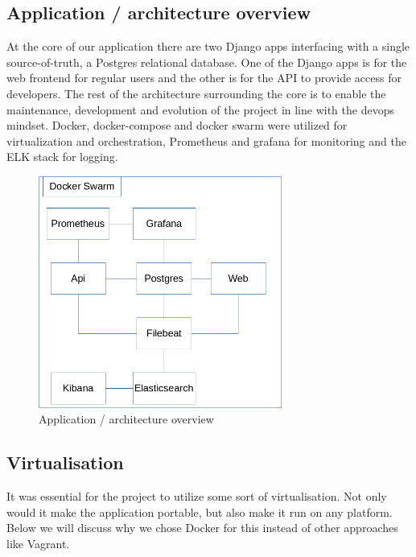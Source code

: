 \documentclass[12pt]{article}
\begin{document}
\subsection{Application / architecture overview}

At the core of our application there are two Django apps interfacing with a single source-of-truth, a Postgres relational database. One of the Django apps is for the web frontend for regular users and the other is for the API to provide access for developers. The rest of the architecture surrounding the core is to enable the maintenance, development and evolution of the project in line with the devops mindset. Docker, docker-compose and docker swarm were utilized for virtualization and orchestration, Prometheus and grafana for monitoring and the ELK stack for logging. 
\begin{figure}[h!]
    \centering
    \includegraphics[width=8cm]{structure}
    \caption{Application / architecture overview}
    \label{fig:structure}
\end{figure}

\subsection{Virtualisation}
It was essential for the project to utilize some sort of virtualisation. Not only would it make the application portable, but also make it run on any platform. Below we will discuss why we chose Docker for this instead of other approaches like Vagrant. 
\end{document}
